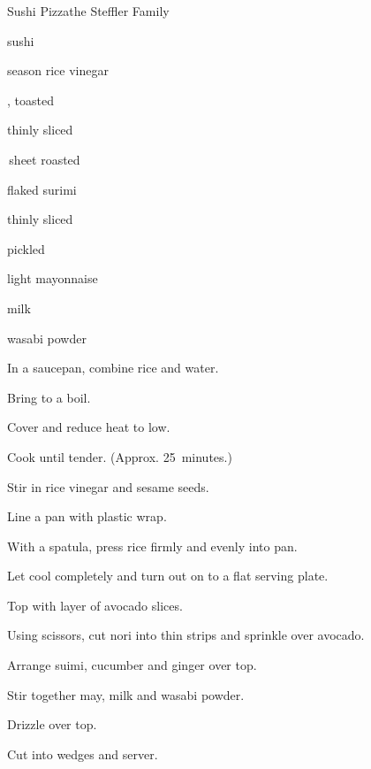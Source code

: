 \begin{recipe}{Sushi Pizza}{the Steffler Family}{}

\begin{ingredients}
\item {} sushi 
\item \C{\quarter} season rice vinegar
\item {} , toasted 
\item \half thinly sliced 
\item \half\,sheet roasted 
\item \C{\threequarter} flaked surimi
\item \C{\half} thinly sliced 
\item {} pickled 
\item {} light mayonnaise
\item {} milk
\item {} wasabi powder
\end{ingredients}

\begin{directions}
\item In a saucepan, combine rice and \C{1\quarter} water.
\item Bring to a boil.
\item Cover and reduce heat to low.
\item Cook until tender. (Approx. 25~minutes.)
\item Stir in rice vinegar and sesame seeds.
\item Line a pan with plastic wrap.
\item With a spatula, press rice firmly and evenly into pan.
\item Let cool completely and turn out on to a flat serving plate.
\item Top with layer of avocado slices.
\item Using scissors, cut nori into thin strips and sprinkle over avocado.
\item Arrange suimi, cucumber and ginger over top.
\item Stir together may, milk and wasabi powder.
\item Drizzle over top.
\item Cut into wedges and server.
\end{directions}
\end{recipe}
